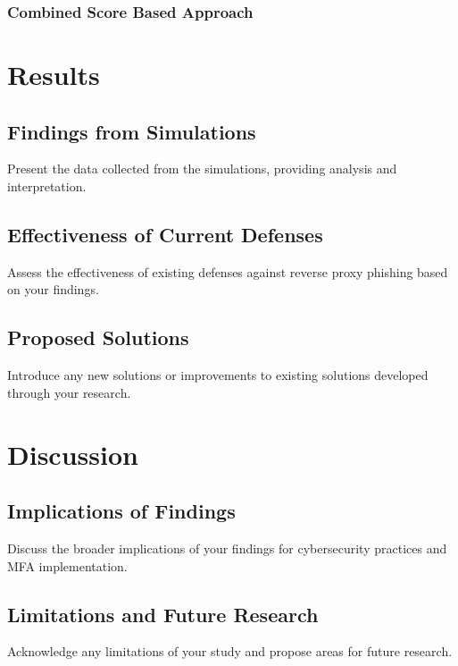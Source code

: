 \documentclass[12pt]{scrbook}
\begin{document}
\newpage \subsection{Combined Score Based Approach}

\chapter{Results} \section{Findings from Simulations} Present the data collected
from the simulations, providing analysis and interpretation.

\section{Effectiveness of Current Defenses} Assess the effectiveness of existing
defenses against reverse proxy phishing based on your findings.

\section{Proposed Solutions} Introduce any new solutions or improvements to
existing solutions developed through your research.

\chapter{Discussion} \section{Implications of Findings} Discuss the broader
implications of your findings for cybersecurity practices and MFA
implementation.

\section{Limitations and Future Research} Acknowledge any limitations of your
study and propose areas for future research.

\newpage  
\end{document}
